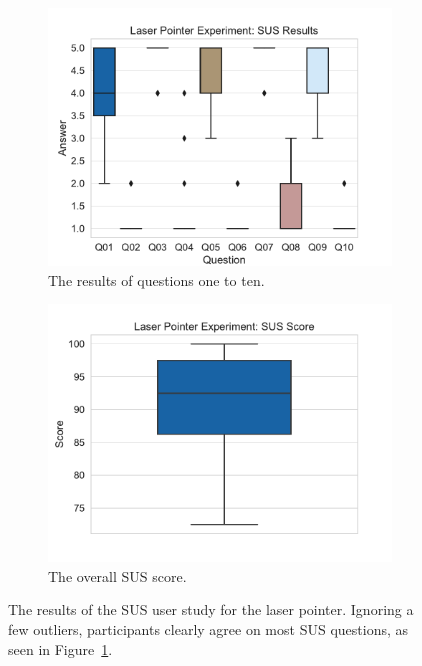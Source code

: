 \begin{figure}[H]
	\centering
	\begin{subfigure}[t]{.48\linewidth}%
		\centering
		\includegraphics[width=\linewidth]{figures/evaluation/res_exp_lp.pdf}
    \caption{The results of questions one to ten.}\label{fig:res-exp-lp}
	\end{subfigure}%
	\hspace{0.04\linewidth}%
	\begin{subfigure}[t]{.48\linewidth}%
		\centering
		\includegraphics[width=\linewidth]{figures/evaluation/score_exp_lp.pdf}
		\caption{The overall \gls{SUS} score.}\label{fig:score-exp-lp}
	\end{subfigure}%
	\caption[Laser pointer SUS results]{The results of the \gls{SUS} user study for the laser pointer. Ignoring a few outliers, participants clearly agree on most \gls{SUS} questions, as seen in Figure~\ref{fig:res-exp-lp}.}\label{fig:exp-lp-stats}
\end{figure}

